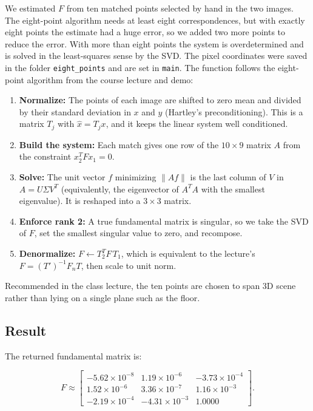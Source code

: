 \documentclass[11pt,letterpaper]{article}
\begin{document}
We estimated $F$ from ten matched points selected by hand in the two images. The eight-point algorithm needs at least eight correspondences, but with exactly eight points the estimate had a huge error, so we added two more points to reduce the error. With more than eight points the system is overdetermined and is solved in the least-squares sense by the SVD. The pixel coordinates were saved in the folder \texttt{eight\_points} and are set in \texttt{main}. The function follows the eight-point algorithm from the course lecture and demo:

\begin{enumerate}
    \item \textbf{Normalize:} The points of each image are shifted to zero
          mean and divided by their standard deviation in $x$ and $y$
          (Hartley's preconditioning). This is a matrix $T_j$ with
          $\hat{x}=T_jx$, and it keeps the linear system well
          conditioned.
    \item \textbf{Build the system:} Each match gives one row of the
          $10\times9$ matrix $A$ from the constraint $x_2^TFx_1=0$.
    \item \textbf{Solve:} The unit vector $f$ minimizing $\|Af\|$ is the
          last column of $V$ in $A=U\Sigma V^T$ (equivalently, the
          eigenvector of $A^TA$ with the smallest eigenvalue). It is
          reshaped into a $3\times3$ matrix.
    \item \textbf{Enforce rank 2:} A true fundamental matrix is singular,
          so we take the SVD of $F$, set the smallest singular value to
          zero, and recompose.
    \item \textbf{Denormalize:} $F \leftarrow T_2^T F\, T_1$, which is
          equivalent to the lecture's $F=(T')^{-1}F_nT$, then scale to
          unit norm.
\end{enumerate}

Recommended in the class lecture, the ten points are chosen to span 3D scene rather than lying on a single plane such as the floor. 

\subsection*{Result}
The returned fundamental matrix is: 

\[
F \approx
\begin{bmatrix}
-5.62\times10^{-8} & 1.19\times10^{-6} & -3.73\times10^{-4} \\
 1.52\times10^{-6} & 3.36\times10^{-7} &  1.16\times10^{-3} \\
-2.19\times10^{-4} & -4.31\times10^{-3} & 1.0000
\end{bmatrix}.
\]
\end{document}
